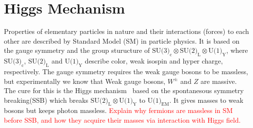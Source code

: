 \section{Higgs Mechanism}

Properties of elementary particles in nature and their interactions (forces)
to each other are described by Standard Model (SM) in particle physics. It is 
based on the gauge symmetry and the group sturucture of 
$\textrm{SU(3)}_\textrm{c} \otimes \textrm{SU(2)}_\textrm{L} 
\otimes \textrm{U(1)}_\textrm{Y}$, where  $\textrm{SU(3)}_\textrm{c}$, 
$\textrm{SU(2)}_\textrm{L}$ and $\textrm{U(1)}_\textrm{Y}$  
describe color, weak isospin and hyper charge, respectively. 
The gauge symmetry requires the weak gauge bosons to be massless,
but experimentally we know that Weak gauge bosons, $W^\pm$ and $Z$ are massive. 
The cure for this is the Higgs mechanism~\cite{}
based on the spontanesous symmetry breaking(SSB)
which breaks $\textrm{SU(2)}_\textrm{L} \otimes \textrm{U(1)}_\textrm{Y}$
to $\textrm{U(1)}_{\textrm{EM}}$. It gives masses to weak bosons but keeps photon massless. 
\textcolor{red}{Explain why fermions are massless in SM before SSB, 
and how they acquire their masses via interaction with Higgs field.
}


